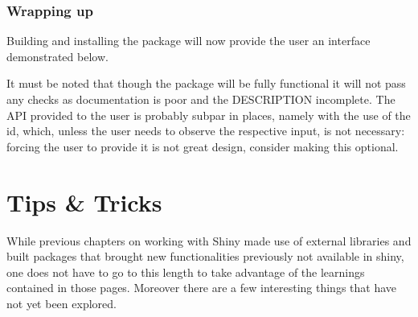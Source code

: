 \documentclass[
]{krantz}
\makeatletter
\newenvironment{Shaded}{\begin{snugshade}}{\end{snugshade}}
\newcommand{\ControlFlowTok}[1]{\textcolor[rgb]{0.27,0.27,0.27}{\textbf{#1}}}
\newcommand{\KeywordTok}[1]{\textcolor[rgb]{0.27,0.27,0.27}{\textbf{#1}}}
\newcommand{\NormalTok}[1]{#1}
\newcommand{\OperatorTok}[1]{\textcolor[rgb]{0.43,0.43,0.43}{\textbf{#1}}}
\newcommand{\StringTok}[1]{\textcolor[rgb]{0.5,0.5,0.5}{#1}}
\newenvironment{kframe}{%
\medskip{}
\setlength{\fboxsep}{.8em}
 \def\at@end@of@kframe{}%
 \ifinner\ifhmode%
  \def\at@end@of@kframe{\end{minipage}}%
  \begin{minipage}{\columnwidth}%
 \fi\fi%
 \def\FrameCommand##1{\hskip\@totalleftmargin \hskip-\fboxsep
 \colorbox{shadecolor}{##1}\hskip-\fboxsep
     \hskip-\linewidth \hskip-\@totalleftmargin \hskip\columnwidth}%
 \MakeFramed {\advance\hsize-\width
   \@totalleftmargin\z@ \linewidth\hsize
   \@setminipage}}%
 {\par\unskip\endMakeFramed%
 \at@end@of@kframe}
\renewenvironment{Shaded}{\begin{kframe}}{\end{kframe}}
\makeatother
\begin{document}
\hypertarget{wrapping-up}{%
\subsection{Wrapping up}\label{wrapping-up}}

Building and installing the package will now provide the user an interface demonstrated below.

\begin{Shaded}
\end{Shaded}

It must be noted that though the package will be fully functional it will not pass any checks as documentation is poor and the DESCRIPTION incomplete. The API provided to the user is probably subpar in places, namely with the use of the id, which, unless the user needs to observe the respective input, is not necessary: forcing the user to provide it is not great design, consider making this optional.

\hypertarget{tips-tricks}{%
\chapter{Tips \& Tricks}\label{tips-tricks}}

While previous chapters on working with Shiny made use of external libraries and built packages that brought new functionalities previously not available in shiny, one does not have to go to this length to take advantage of the learnings contained in those pages. Moreover there are a few interesting things that have not yet been explored.
\end{document}
